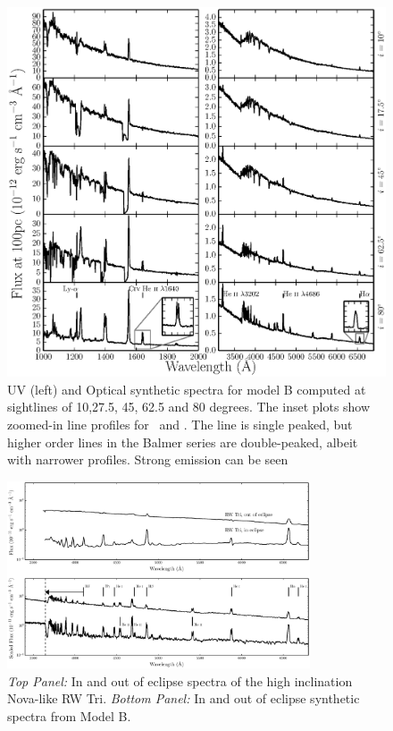 \documentclass[preprint, a4paper, 11pt]{aastex}
\begin{document}
\begin{figure} %
\includegraphics[width=\textwidth]{figures/fig14_uv_opt.eps}
\caption{
UV (left) and Optical synthetic spectra for model B computed at
sightlines of 10,27.5, 45, 62.5 and 80 degrees.	
The inset plots show zoomed-in line profiles for 
\heiiuv \ and \ha. The \ha line 
is single peaked, but higher order lines in the Balmer series
are double-peaked, albeit with narrower profiles.
Strong \heiiopt emission can be seen
}
\label{uvoptb}
\end{figure} %


\begin{figure} %
\includegraphics[width=0.8\textwidth]{figures/fig13_eclipse.eps}
\caption{{\sl Top Panel:} In and out of eclipse spectra of the high
inclination Nova-like RW Tri. {\sl Bottom Panel:} In and out of eclipse synthetic
spectra from Model B.}
\label{rwtricomp}
\end{figure} %
\end{document}
